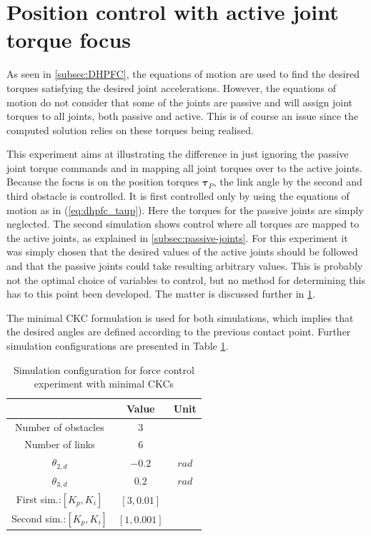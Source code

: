 \section{Position control with active joint torque focus}

As seen in \ref{subsec:DHPFC}, the equations of motion are used to find the desired torques satisfying the desired joint accelerations. However, the equations of motion do not consider that some of the joints are passive and will assign joint torques to all joints, both passive and active. This is of course an issue since the computed solution relies on these torques being realised.

This experiment aims at illustrating the difference in just ignoring the passive joint torque commands and in mapping all joint torques over to the active joints. Because the focus is on the position torques $\boldsymbol{\tau}_P$, the link angle by the second and third obstacle is controlled. It is first controlled only by using the equations of motion as in (\ref{eq:dhpfc_taup}). Here the torques for the passive joints are simply neglected. The second simulation shows control where all torques are mapped to the active joints, as explained in \ref{subsec:passive-joints}. For this experiment it was simply chosen that the desired values of the active joints should be followed and that the passive joints could take resulting arbitrary values. This is probably not the optimal choice of variables to control, but no method for determining this has to this point been developed. The matter is discussed further in \ref{}.

The minimal CKC formulation is used for both simulations, which implies that the desired angles are defined according to the previous contact point. Further simulation configurations are presented in Table \ref{tab:exp_2xp}.

\begin{table}[]
    \centering
    \begin{tabular}{|c|c|c|}
        \hline
        & Value & Unit\\
        \hline
        Number of obstacles & $3$ & \\
        Number of links & $6$ & \\
        $\theta_{2,d}$ & $-0.2$ & $rad$ \\
        $\theta_{3,d}$ & $0.2$ & $rad$ \\
        First sim.:$[K_{p}, K_{i}]$ & $[3, 0.01]$ &\\
        Second sim.:$[K_{p}, K_{i}]$ & $[1, 0.001]$ &\\
        \hline
    \end{tabular}
    \caption{Simulation configuration for force control experiment with minimal CKCs}
    \label{tab:exp_2xp}
\end{table}

